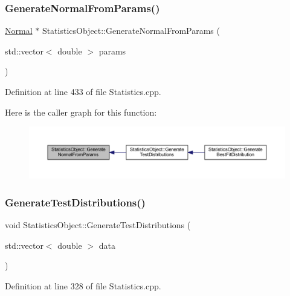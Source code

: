 \subsubsection{\texorpdfstring{Generate\+Normal\+From\+Params()}{GenerateNormalFromParams()}}
{\footnotesize\ttfamily \hyperlink{class_normal}{Normal} $\ast$ Statistics\+Object\+::\+Generate\+Normal\+From\+Params (\begin{DoxyParamCaption}\item[{std\+::vector$<$ double $>$}]{params }\end{DoxyParamCaption})}



Definition at line 433 of file Statistics.\+cpp.

Here is the caller graph for this function\+:\nopagebreak
\begin{figure}[H]
\begin{center}
\leavevmode
\includegraphics[width=350pt]{class_statistics_object_a59cffa517dbb293e1f8fe72f2e6dd34f_icgraph}
\end{center}
\end{figure}
\mbox{\label{class_statistics_object_a7efac97d5d339216bb81bd361419799d}} 
\subsubsection{\texorpdfstring{Generate\+Test\+Distributions()}{GenerateTestDistributions()}}
{\footnotesize\ttfamily void Statistics\+Object\+::\+Generate\+Test\+Distributions (\begin{DoxyParamCaption}\item[{std\+::vector$<$ double $>$}]{data }\end{DoxyParamCaption})}



Definition at line 328 of file Statistics.\+cpp.

